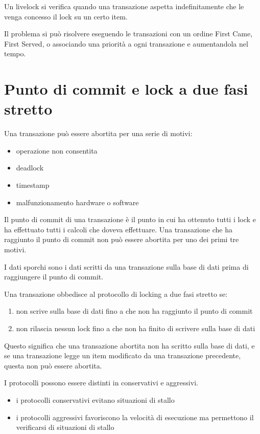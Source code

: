 Un livelock si verifica quando una transazione aspetta indefinitamente che le venga concesso il lock su un certo item.

Il problema si pu\`o risolvere eseguendo le transazioni con un ordine First Came, First Served, o associando una priorit\`a a ogni transazione e aumentandola nel tempo.

\section{Punto di commit e lock a due fasi stretto}

Una transazione pu\`o essere abortita per una serie di motivi:
\begin{itemize}
    \item operazione non consentita
    \item deadlock
    \item timestamp
    \item malfunzionamento hardware o software
\end{itemize}

Il punto di commit di una transazione \`e il punto in cui ha ottenuto tutti i lock e ha effettuato tutti i calcoli che doveva effettuare. Una transazione che ha raggiunto il punto di commit non pu\`o essere abortita per uno dei primi tre motivi.

I dati sporchi sono i dati scritti da una transazione sulla base di dati prima di raggiungere il punto di commit.

Una transazione obbedisce al protocollo di locking a due fasi stretto se:
\begin{enumerate}
    \item non scrive sulla base di dati fino a che non ha raggiunto il punto di commit
    \item non rilascia nessun lock fino a che non ha finito di scrivere sulla base di dati
\end{enumerate}
Questo significa che una transazione abortita non ha scritto sulla base di dati, e se una transazione legge un item modificato da una transazione precedente, questa non pu\`o essere abortita.

I protocolli possono essere distinti in conservativi e aggressivi.
\begin{itemize}
    \item i protocolli conservativi evitano situazioni di stallo
    \item i protocolli aggressivi favoriscono la velocit\`a di esecuzione ma permettono il verificarsi di situazioni di stallo
\end{itemize}

